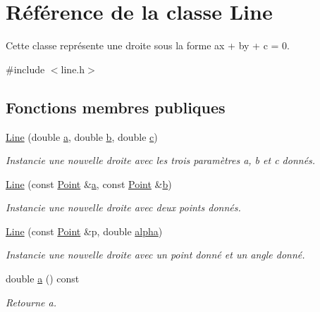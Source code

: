 \hypertarget{classLine}{\section{Référence de la classe Line}
\label{classLine}
}


Cette classe représente une droite sous la forme ax + by + c = 0.  




{\ttfamily \#include $<$line.\+h$>$}

\subsection*{Fonctions membres publiques}
\begin{DoxyCompactItemize}
\item 
\hyperlink{classLine_aba5e77c92e5e6932e90d0c083e6509e5}{Line} (double \hyperlink{classLine_a47fbf6abd88d639659beb7a5c7a22a86}{a}, double \hyperlink{classLine_a3fbf3dbd1b40db13b2624d69ab5cca27}{b}, double \hyperlink{classLine_a178f0e9f733556ef03ba94e5aac96005}{c})
\begin{DoxyCompactList}\small\item\em Instancie une nouvelle droite avec les trois paramètres a, b et c donnés. \end{DoxyCompactList}\item 
\hyperlink{classLine_a0ec34f80a43014768ec228bfa87fd15f}{Line} (const \hyperlink{classPoint}{Point} \&\hyperlink{classLine_a47fbf6abd88d639659beb7a5c7a22a86}{a}, const \hyperlink{classPoint}{Point} \&\hyperlink{classLine_a3fbf3dbd1b40db13b2624d69ab5cca27}{b})
\begin{DoxyCompactList}\small\item\em Instancie une nouvelle droite avec deux points donnés. \end{DoxyCompactList}\item 
\hyperlink{classLine_a30f99e975efe2a498c2d8ad7c9d1cdf2}{Line} (const \hyperlink{classPoint}{Point} \&p, double \hyperlink{classLine_afe0a0abb45c0adccaedfaded8645600f}{alpha})
\begin{DoxyCompactList}\small\item\em Instancie une nouvelle droite avec un point donné et un angle donné. \end{DoxyCompactList}\item 
double \hyperlink{classLine_a47fbf6abd88d639659beb7a5c7a22a86}{a} () const 
\begin{DoxyCompactList}\small\item\em Retourne a. \end{DoxyCompactList}\item 

\end{DoxyCompactItemize}
